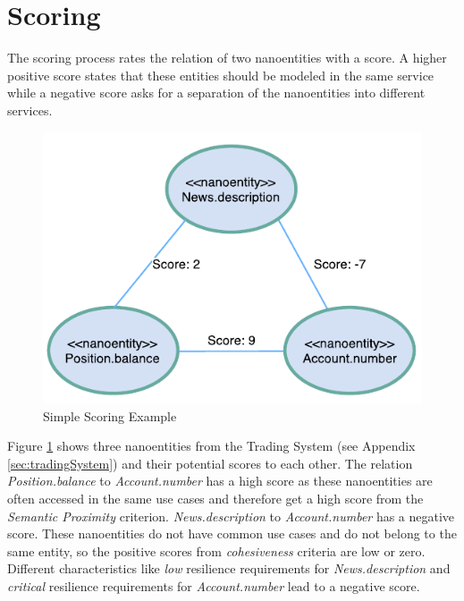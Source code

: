 
\section{Scoring}

The scoring process rates the relation of two nanoentities with a score. A higher positive score states that these entities should be modeled in the same service while a negative score asks for a separation of the nanoentities into different services.

\begin{figure}[H]
	\begin{center}
		\includegraphics[scale=1]{diagrams/scoring_example.pdf}
		\caption{Simple Scoring Example}
		\label{fig:scoringExample}
	\end{center}
\end{figure}

Figure \ref{fig:scoringExample} shows three nanoentities from the Trading System (see Appendix \ref{sec:tradingSystem}) and their potential scores to each other. The relation \textit{Position.balance} to \textit{Account.number} has a high score as these nanoentities are often accessed in the same use cases and therefore get a high score from the \textit{Semantic Proximity} criterion. \textit{News.description} to \textit{Account.number} has a negative score. These nanoentities do not have common use cases and do not belong to the same entity, so the positive scores from \textit{cohesiveness} criteria are low or zero. Different characteristics like \textit{low} resilience requirements for \textit{News.description} and \textit{critical} resilience requirements for \textit{Account.number} lead to a negative score. 

